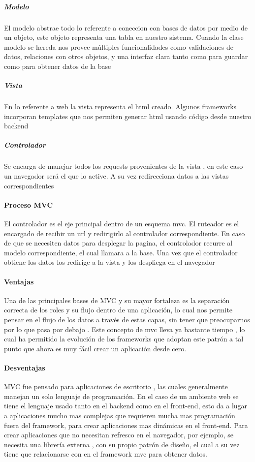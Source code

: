 \subparagraph{Modelo}
El modelo abstrae todo lo referente a coneccion con bases
de datos por medio de un objeto, este objeto representa una tabla en nuestro
sistema. Cuando la clase modelo se hereda nos provee múltiples funcionalidades
como validaciones de datos, relaciones con otros objetos, y una interfaz clara
tanto como para guardar como para obtener datos de la base

\subparagraph{Vista}
En lo referente a web la vista representa el html creado. Algunos frameworks
incorporan templates que nos permiten generar html usando código desde nuestro
backend

\subparagraph{Controlador} Se encarga de manejar todos los requests
provenientes de la vista , en este caso un navegador será el que lo active. A
su vez redirecciona datos a las vistas correspondientes

\paragraph{Proceso MVC}
El controlador es el eje principal dentro de un esquema mvc. El ruteador es el
encargado de recibir un url y redirigirlo al controlador correspondiente. En
caso de que se necesiten datos para desplegar la pagina, el controlador recurre
al modelo correspondiente, el cual llamara a la base. Una vez que el
controlador obtiene los datos los redirige a la vista y los despliega en el
navegador

\paragraph{Ventajas}
Una de las principales bases de MVC y su mayor fortaleza es la separación
correcta de los roles y su flujo dentro de una aplicación, lo cual nos permite
pensar en el flujo de los datos a través de estas capas, sin tener que
preocuparnos por lo que pasa por debajo . Este concepto de mvc lleva ya
bastante tiempo , lo cual ha permitido la evolución de los frameworks que
adoptan este patrón a tal punto que ahora es muy fácil crear un aplicación
desde cero.

\paragraph{Desventajas}
MVC fue pensado para aplicaciones de escritorio , las cuales generalmente
manejan un solo lenguaje de programación. En el caso de un ambiente web se
tiene el lenguaje usado tanto en el backend como en el front-end, esto da a
lugar a aplicaciones mucho mas complejas que requieren mucha mas programación
fuera del framework, para crear aplicaciones mas dinámicas en el front-end.
Para crear aplicaciones que no necesitan refresco en el navegador, por ejemplo,
se necesita una librería externa , con su propio patrón de diseño, el cual a su
vez tiene que relacionarse con en el framework mvc para obtener datos.

